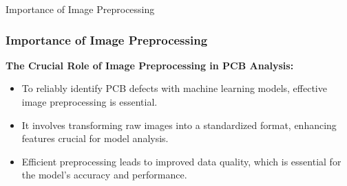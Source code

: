 \begin{frame}{Importance of Image Preprocessing}
    \frametitle{Importance of Image Preprocessing}
    \textbf{The Crucial Role of Image Preprocessing in PCB Analysis:}
    \vspace{0.5em}
    \begin{itemize}
        \item To reliably identify PCB defects with machine learning models, effective image preprocessing is essential.
        \item It involves transforming raw images into a standardized format, enhancing features crucial for model analysis.
        \item Efficient preprocessing leads to improved data quality, which is essential for the model's accuracy and performance.
    \end{itemize}
    \vspace{1em}
\end{frame}
